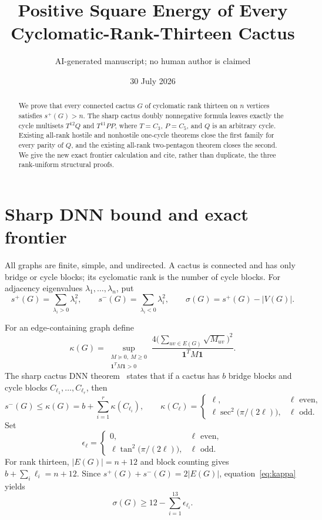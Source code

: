\documentclass[11pt]{article}
\title{Positive Square Energy of Every Cyclomatic-Rank-Thirteen Cactus}
\author{AI-generated manuscript; no human author is claimed}
\date{30 July 2026}
\newcommand{\splus}{s^+}
\newcommand{\sminus}{s^-}
\newcommand{\sig}{\sigma}
\newcommand{\one}{\mathbf 1}
\begin{document}
\maketitle

\begin{abstract}
We prove that every connected cactus $G$ of cyclomatic rank thirteen on $n$
vertices satisfies $s^+(G)>n$.  The sharp cactus doubly nonnegative formula
leaves exactly the cycle multisets $T^{12}Q$ and $T^{11}PP$, where
$T=C_3$, $P=C_5$, and $Q$ is an arbitrary cycle.  Existing all-rank hostile
and nonhostile one-cycle theorems close the first family for every parity of
$Q$, and the existing all-rank two-pentagon theorem closes the second.  We
give the new exact frontier calculation and cite, rather than duplicate, the
three rank-uniform structural proofs.
\end{abstract}

\section{Sharp DNN bound and exact frontier}

All graphs are finite, simple, and undirected.  A cactus is connected and has
only bridge or cycle blocks; its cyclomatic rank is the number of cycle blocks.
For adjacency eigenvalues $\lambda_1,\ldots,\lambda_n$, put
\[
 \splus(G)=\sum_{\lambda_i>0}\lambda_i^2,
 \qquad
 \sminus(G)=\sum_{\lambda_i<0}\lambda_i^2,
 \qquad
 \sig(G)=\splus(G)-|V(G)|.
\]

For an edge-containing graph define
\[
 \kappa(G)=\sup_{\substack{M\succeq0,\ M\geq0\\\one^TM\one>0}}
 \frac{4\bigl(\sum_{uv\in E(G)}\sqrt{M_{uv}}\bigr)^2}
      {\one^TM\one}.
\]
The sharp cactus DNN theorem~\cite{DNN,LTZ} states that if a cactus has $b$
bridge blocks and cycle blocks $C_{\ell_1},\ldots,C_{\ell_r}$, then
\begin{equation}\label{eq:kappa}
 \sminus(G)\leq\kappa(G)
 =b+\sum_{i=1}^r\kappa(C_{\ell_i}),
 \qquad
 \kappa(C_\ell)=
 \begin{cases}
  \ell,&\ell\text{ even},\\
  \ell\sec^2\!\bigl(\pi/(2\ell)\bigr),&\ell\text{ odd}.
 \end{cases}
\end{equation}
Set
\[
 \epsilon_\ell=
 \begin{cases}
  0,&\ell\text{ even},\\
  \ell\tan^2\!\bigl(\pi/(2\ell)\bigr),&\ell\text{ odd}.
 \end{cases}
\]
For rank thirteen, $|E(G)|=n+12$ and block counting gives
$b+\sum_i\ell_i=n+12$.  Since
$\splus(G)+\sminus(G)=2|E(G)|$, equation~\eqref{eq:kappa} yields
\begin{equation}\label{eq:surplus}
 \boxed{\sig(G)\geq12-\sum_{i=1}^{13}\epsilon_{\ell_i}.}
\end{equation}
\end{document}
